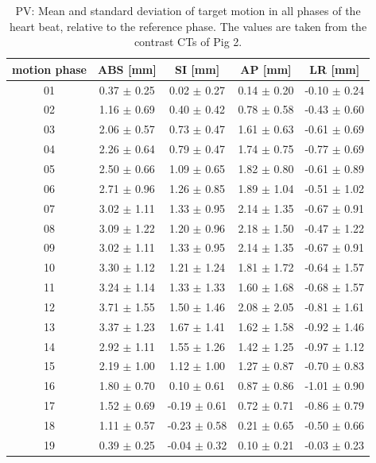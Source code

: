 \documentclass[type=dr, dr=rernat, accentcolor=tud7b,colorbacktitle, bigchapter, openright, twoside, 12pt ]{tudthesis}
\begin{document}
\begin{table}[htbp]
  \centering
    \tiny
  \caption{PV: Mean and standard deviation of target motion in all phases of the heart beat, relative to the reference phase. The values are 
  taken from the contrast CTs of Pig 2.}
  \begin{tabular}{|c|c|c|c|c|}
    \hline\hline
    motion phase\rule{0pt}{2.6ex}\rule[-1.2ex]{0pt}{0pt} & ABS [mm] & SI [mm] & AP [mm] & LR [mm]\\
    \hline
01 &0.37 $\pm$ 0.25 &0.02 $\pm$ 0.27 &0.14 $\pm$ 0.20 &-0.10 $\pm$ 0.24 \\
02 &1.16 $\pm$ 0.69 &0.40 $\pm$ 0.42 &0.78 $\pm$ 0.58 &-0.43 $\pm$ 0.60 \\
03 &2.06 $\pm$ 0.57 &0.73 $\pm$ 0.47 &1.61 $\pm$ 0.63 &-0.61 $\pm$ 0.69 \\
04 &2.26 $\pm$ 0.64 &0.79 $\pm$ 0.47 &1.74 $\pm$ 0.75 &-0.77 $\pm$ 0.69 \\
05 &2.50 $\pm$ 0.66 &1.09 $\pm$ 0.65 &1.82 $\pm$ 0.80 &-0.61 $\pm$ 0.89 \\
06 &2.71 $\pm$ 0.96 &1.26 $\pm$ 0.85 &1.89 $\pm$ 1.04 &-0.51 $\pm$ 1.02 \\
07 &3.02 $\pm$ 1.11 &1.33 $\pm$ 0.95 &2.14 $\pm$ 1.35 &-0.67 $\pm$ 0.91 \\
08 &3.09 $\pm$ 1.22 &1.20 $\pm$ 0.96 &2.18 $\pm$ 1.50 &-0.47 $\pm$ 1.22 \\
09 &3.02 $\pm$ 1.11 &1.33 $\pm$ 0.95 &2.14 $\pm$ 1.35 &-0.67 $\pm$ 0.91 \\
10 &3.30 $\pm$ 1.12 &1.21 $\pm$ 1.24 &1.81 $\pm$ 1.72 &-0.64 $\pm$ 1.57 \\
11 &3.24 $\pm$ 1.14 &1.33 $\pm$ 1.33 &1.60 $\pm$ 1.68 &-0.68 $\pm$ 1.57 \\
12 &3.71 $\pm$ 1.55 &1.50 $\pm$ 1.46 &2.08 $\pm$ 2.05 &-0.81 $\pm$ 1.61 \\
13 &3.37 $\pm$ 1.23 &1.67 $\pm$ 1.41 &1.62 $\pm$ 1.58 &-0.92 $\pm$ 1.46 \\
14 &2.92 $\pm$ 1.11 &1.55 $\pm$ 1.26 &1.42 $\pm$ 1.25 &-0.97 $\pm$ 1.12 \\
15 &2.19 $\pm$ 1.00 &1.12 $\pm$ 1.00 &1.27 $\pm$ 0.87 &-0.70 $\pm$ 0.83 \\
16 &1.80 $\pm$ 0.70 &0.10 $\pm$ 0.61 &0.87 $\pm$ 0.86 &-1.01 $\pm$ 0.90 \\
17 &1.52 $\pm$ 0.69 &-0.19 $\pm$ 0.61 &0.72 $\pm$ 0.71 &-0.86 $\pm$ 0.79 \\
18 &1.11 $\pm$ 0.57 &-0.23 $\pm$ 0.58 &0.21 $\pm$ 0.65 &-0.50 $\pm$ 0.66 \\
19 &0.39 $\pm$ 0.25 &-0.04 $\pm$ 0.32 &0.10 $\pm$ 0.21 &-0.03 $\pm$ 0.23 \\
    \hline\hline
  \end{tabular}
  \label{tab:motion:PV:Pig2}
\end{table}
\end{document}
